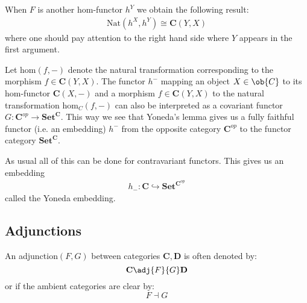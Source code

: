 	\begin{result}
		When $F$ is another hom-functor $h^Y$ we obtain the following result:
		\begin{gather}
			\text{Nat}(h^X, h^Y)\cong\textbf{C}(Y, X)
		\end{gather}
		where one should pay attention to the right hand side where $Y$ appears in the first argument.
		
		Let $\text{hom}(f, -)$ denote the natural transformation corresponding to the morphism $f\in\textbf{C}(Y,X)$. The functor $h^-$ mapping an object $X\in\ob{C}$ to its hom-functor $\textbf{C}(X, -)$ and a morphism $f\in\textbf{C}(Y, X)$ to the natural transformation hom$_C(f, -)$ can also be interpreted as a covariant functor $G:\textbf{C}^{op}\rightarrow\textbf{Set}^{\textbf{C}}$. This way we see that Yoneda's lemma gives us a fully faithful functor (i.e. an embedding) $h^-$ from the opposite category $\textbf{C}^{op}$ to the functor category $\textbf{Set}^{\textbf{C}}$.
		
		As usual all of this can be done for contravariant functors. This gives us an embedding
		\begin{gather}
			h_-:\textbf{C}\hookrightarrow\textbf{Set}^{\textbf{C}^{op}}
		\end{gather}
		called the Yoneda embedding. 
	\end{result}
	
\subsection{Adjunctions}\label{section:category:adjunction}

	\begin{notation}
		An adjunction$(F, G)$ between categories $\mathbf{C}, \mathbf{D}$ is often denoted by: \[\textbf{C}\adj{F}{G}\textbf{D}\] or if the ambient categories are clear by: \[F\dashv G\]
	\end{notation}
	
